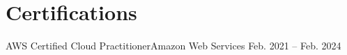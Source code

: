 \section{Certifications}
  \resumeSubHeadingListStart
    \resumeSubheading
      {AWS Certified Cloud Practitioner}{Amazon Web Services}
      {}{Feb. 2021 -- Feb. 2024}
  \resumeSubHeadingListEnd
